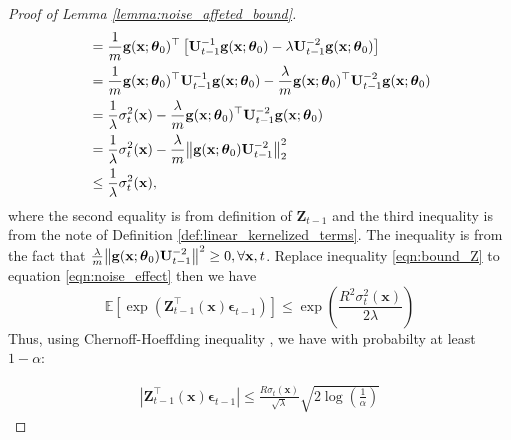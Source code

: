 \begin{proof}[Proof of Lemma \ref{lemma:noise_affeted_bound}]
\begin{equation}
\begin{split}
        & = \frac{1}{m} \mathbf{g}(\mathbf{x}; \boldsymbol{\theta}_0)^\top \left[ \mathbf{U}^{-1}_{t-1} \mathbf{g}(\mathbf{x}; \boldsymbol{\theta}_0) - \lambda \mathbf{U}^{-2}_{t-1}\mathbf{g}(\mathbf{x}; \boldsymbol{\theta}_0) \right] \\ 
        & = \frac{1}{m} \mathbf{g}(\mathbf{x}; \boldsymbol{\theta}_0)^\top \mathbf{U}^{-1}_{t-1} \mathbf{g}(\mathbf{x}; \boldsymbol{\theta}_0) - \frac{\lambda}{m} \mathbf{g}(\mathbf{x}; \boldsymbol{\theta}_0)^\top \mathbf{U}^{-2}_{t-1}\mathbf{g}(\mathbf{x}; \boldsymbol{\theta}_0)\\
        & = \frac{1}{\lambda}\sigma_t^2(\mathbf{x}) - \frac{\lambda}{m} \mathbf{g}(\mathbf{x}; \boldsymbol{\theta}_0)^\top \mathbf{U}^{-2}_{t-1}\mathbf{g}(\mathbf{x}; \boldsymbol{\theta}_0)\\ 
        & = \frac{1}{\lambda}\sigma_t^2(\mathbf{x}) - \frac{\lambda}{m} \norm{\mathbf{g}(\mathbf{x}; \boldsymbol{\theta}_0) \mathbf{U}^{-2}_{t-1}}^2_2 \\
        & \leq \frac{1}{\lambda} \sigma_t^2(\mathbf{x}),
\end{split}
\end{equation}
where the second equality is from definition of $\mathbf{Z}_{t-1}$ and the third inequality is from the note of Definition \ref{def:linear_kernelized_terms}.  The inequality is from the fact that  $\frac{\lambda}{m} \norm{\mathbf{g}(\mathbf{x}; \boldsymbol{\theta}_0) \mathbf{U}^{-2}_{t-1}}^2 \ge 0, \forall \mathbf{x},t$. Replace inequality \ref{eqn:bound_Z} to equation \ref{eqn:noise_effect} then we have 
\[ \mathbb E \left[\exp \left( \mathbf{Z}_{t-1}^\top(\mathbf{x})\boldsymbol{\epsilon}_{t-1}   \right) \right] \leq \exp (\frac{R^2\sigma_t^2(\mathbf{x})}{2\lambda}) \]
Thus, using Chernoff-Hoeffding inequality \cite{antonini2008convergence}, we have with probabilty at least $1-\alpha$: 

\begin{equation*}
    \begin{split}
        \left \lvert \mathbf{Z}_{t-1}^\top(\mathbf{x})\boldsymbol{\epsilon}_{t-1} \right \rvert \leq \frac{R\sigma_t(\mathbf{x})}{\sqrt{\lambda}} \sqrt{2 \log(\frac{1}{\alpha})}
    \end{split}
\end{equation*}
\end{proof}


